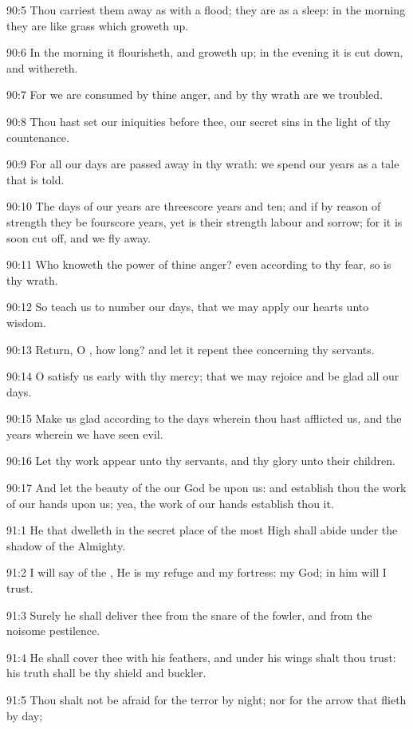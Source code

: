 90:5 Thou carriest them away as with a flood; they are as a sleep: in
the morning they are like grass which groweth up.

90:6 In the morning it flourisheth, and groweth up; in the evening it
is cut down, and withereth.

90:7 For we are consumed by thine anger, and by thy wrath are we
troubled.

90:8 Thou hast set our iniquities before thee, our secret sins in the
light of thy countenance.

90:9 For all our days are passed away in thy wrath: we spend our years
as a tale that is told.

90:10 The days of our years are threescore years and ten; and if by
reason of strength they be fourscore years, yet is their strength
labour and sorrow; for it is soon cut off, and we fly away.

90:11 Who knoweth the power of thine anger? even according to thy
fear, so is thy wrath.

90:12 So teach us to number our days, that we may apply our hearts
unto wisdom.

90:13 Return, O \LORD, how long? and let it repent thee concerning thy
servants.

90:14 O satisfy us early with thy mercy; that we may rejoice and be
glad all our days.

90:15 Make us glad according to the days wherein thou hast afflicted
us, and the years wherein we have seen evil.

90:16 Let thy work appear unto thy servants, and thy glory unto their
children.

90:17 And let the beauty of the \LORD our God be upon us: and establish
thou the work of our hands upon us; yea, the work of our hands
establish thou it.



91:1 He that dwelleth in the secret place of the most High shall abide
under the shadow of the Almighty.

91:2 I will say of the \LORD, He is my refuge and my fortress: my God;
in him will I trust.

91:3 Surely he shall deliver thee from the snare of the fowler, and
from the noisome pestilence.

91:4 He shall cover thee with his feathers, and under his wings shalt
thou trust: his truth shall be thy shield and buckler.

91:5 Thou shalt not be afraid for the terror by night; nor for the
arrow that flieth by day;

